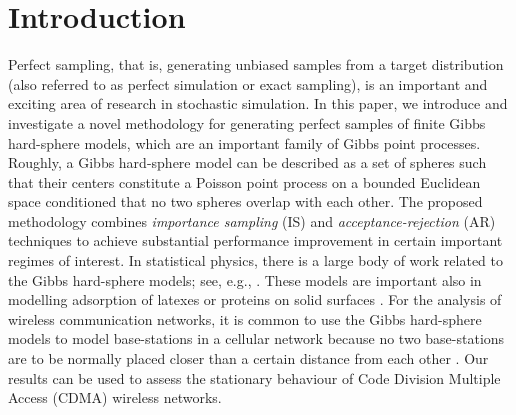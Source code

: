 \documentclass[11pt]{article}
\begin{document}
\section{Introduction}
Perfect sampling, that is, generating unbiased samples from a target distribution (also referred to as perfect simulation or exact sampling), is an important and exciting area of research in stochastic simulation. In this paper, {we introduce and investigate a novel methodology for generating perfect samples of finite Gibbs hard-sphere models}, which are an important family of Gibbs point processes. Roughly, a Gibbs hard-sphere model can be described as a set of spheres such that their centers constitute a Poisson point process on a bounded Euclidean space conditioned that
no two spheres overlap with each other.
The proposed methodology combines {\it importance sampling} (IS) and {\it acceptance-rejection} (AR) techniques to achieve  substantial performance improvement in certain important regimes of interest.
 In statistical physics, there is a large body of work related to the Gibbs hard-sphere models; see, e.g., \cite{Pathria72, MM40, Adams74, AS13, LM66, SRJ53, JM13, BT16}.
These models are important also in modelling adsorption of latexes or proteins on solid surfaces \cite[and references therein]{TST90, SVS00}. 
For the analysis of wireless communication networks, it is common to use the Gibbs hard-sphere models to model base-stations in a cellular network because no two base-stations are to be normally placed closer than a certain distance from each other \cite{SKM87, Haenggi12}.
Our results can be used to assess the stationary behaviour of Code Division Multiple Access (CDMA) wireless networks.\\
\end{document}
